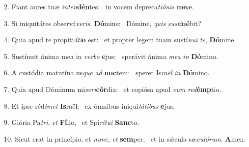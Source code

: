 2. Fiant aures tuæ \textit{in}\textit{ten}\textbf{dén}tes: \ast\  in vocem depreca\textit{ti}\textit{ó}\textit{nis} \textbf{me}æ.\

3. Si iniquitátes observá\textit{ve}\textit{ris}, \textbf{Dó}mine: \ast\  Dómine, \textit{quis} \textit{sus}\textit{ti}\textbf{né}bit?\

4. Quia apud te propiti\textit{á}\textit{ti}\textbf{o} est: \ast\  et propter legem tuam sustí\textit{nu}\textit{i} \textit{te}, \textbf{Dó}mine.\

5. Sustínuit ánima mea in \textit{ver}\textit{bo} \textbf{e}jus: \ast\  sperávit ánima \textit{me}\textit{a} \textit{in} \textbf{Dó}mino.\

6. A custódia matutína us\textit{que} \textit{ad} \textbf{noc}tem: \ast\  speret Is\textit{ra}\textit{ël} \textit{in} \textbf{Dó}mino.\

7. Quia apud Dóminum mi\textit{se}\textit{ri}\textbf{cór}dia: \ast\  et copiósa apud \textit{e}\textit{um} \textit{red}\textbf{émp}tio.\

8. Et ipse réd\textit{i}\textit{met} \textbf{Is}raël: \ast\  ex ómnibus iniqui\textit{tá}\textit{ti}\textit{bus} \textbf{e}jus.\

9. Glória Pa\textit{tri}, \textit{et} \textbf{Fí}lio, \ast\  et Spi\textit{rí}\textit{tu}\textit{i} \textbf{Sanc}to.\

10. Sicut erat in princípio, et \textit{nunc}, \textit{et} \textbf{sem}per, \ast\  et in sǽcula sæ\textit{cu}\textit{ló}\textit{rum}. \textbf{A}men.\

